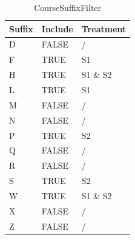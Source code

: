 \begin{table}[]
  \centering
  \caption{CourseSuffixFilter}
  \label{CourseSuffixFilter}
  \begin{tabular}{lll}
    Suffix & Include & Treatment \\ \hline
    D      & FALSE   & /         \\
    F      & TRUE    & S1        \\
    H      & TRUE    & S1 \& S2  \\
    L      & TRUE    & S1        \\
    M      & FALSE   & /         \\
    N      & FALSE   & /         \\
    P      & TRUE    & S2        \\
    Q      & FALSE   & /         \\
    R      & FALSE   & /         \\
    S      & TRUE    & S2        \\
    W      & TRUE    & S1 \& S2  \\
    X      & FALSE   & /         \\
    Z      & FALSE   & /         \\ \hline
  \end{tabular}
\end{table}

